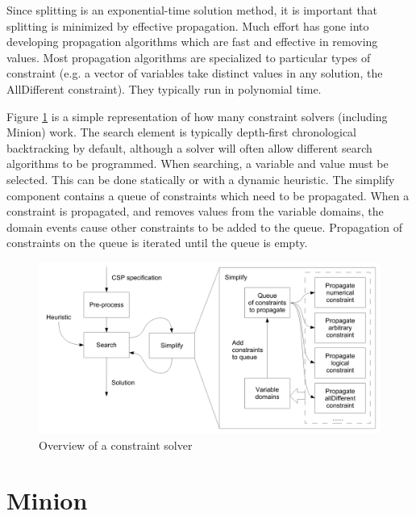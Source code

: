 \documentclass[oneside]{book}
\begin{document}
Since splitting is an exponential-time solution method, it is important
that splitting is minimized by effective propagation. Much effort
has gone into developing propagation algorithms which are fast and
effective in removing values. Most propagation algorithms are specialized
to particular types of constraint (e.g. a vector of variables take
distinct values in any solution, the AllDifferent constraint). They
typically run in polynomial time.

Figure \ref{fig:solver-overview} is a simple representation of how
many constraint solvers (including Minion) work. The search element
is typically depth-first chronological backtracking by default, although
a solver will often allow different search algorithms to be programmed.
When searching, a variable and value must be selected. This can be
done statically or with a dynamic heuristic. The simplify component
contains a queue of constraints which need to be propagated. When
a constraint is propagated, and removes values from the variable domains,
the domain events cause other constraints to be added to the queue.
Propagation of constraints on the queue is iterated until the queue
is empty.

%
\begin{figure}
\begin{centering}
\includegraphics[width=1\textwidth]{litreview-solver-diagram}
\par\end{centering}

\caption{\label{fig:solver-overview}Overview of a constraint solver}

\end{figure}

\section{Minion}
\end{document}

